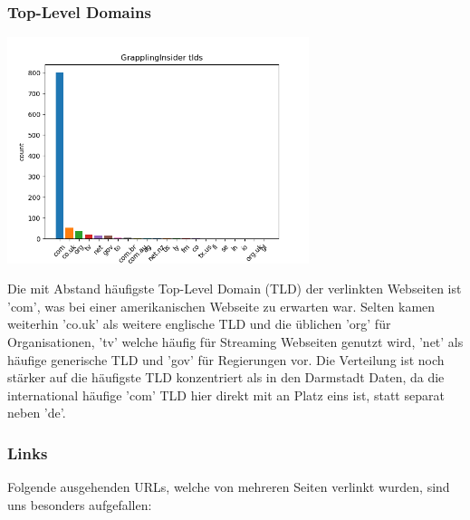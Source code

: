 \subsubsection*{Top-Level Domains}

\begin{center}
	\includegraphics[width=0.66\textwidth]{images/GrapplingInsiderTLDs.png}
\end{center}

\noindent Die mit Abstand häufigste Top-Level Domain (TLD) der verlinkten Webseiten ist 'com', was bei einer amerikanischen Webseite zu erwarten war. Selten kamen weiterhin 'co.uk' als weitere englische TLD und die üblichen 'org' für Organisationen, 'tv' welche häufig für Streaming Webseiten genutzt wird, 'net' als häufige generische TLD und 'gov' für Regierungen vor. Die Verteilung ist noch stärker auf die häufigste TLD konzentriert als in den Darmstadt Daten, da die international häufige 'com' TLD hier direkt mit an Platz eins ist, statt separat neben 'de'.

\subsubsection*{Links}

Folgende ausgehenden URLs, welche von mehreren Seiten verlinkt wurden, sind uns besonders aufgefallen:

